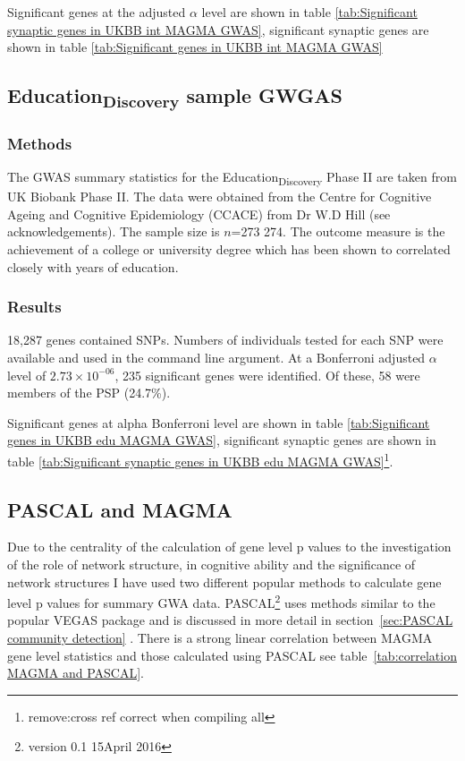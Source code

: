 Significant genes at the adjusted $\alpha$ level are shown in table \ref{tab:Significant synaptic genes in UKBB int  MAGMA GWAS}, significant synaptic genes are shown in table \ref{tab:Significant genes in UKBB int MAGMA GWAS}







\subsection{Education\textsubscript{Discovery} sample GWGAS}
\label{sec:UKBB Education discovery GWGAS}
\subsubsection{Methods}
The GWAS summary statistics for the Education\textsubscript{Discovery} Phase II are taken from UK Biobank Phase II. The data were obtained from the Centre for Cognitive Ageing and Cognitive Epidemiology (CCACE) from Dr W.D Hill (see acknowledgements). The sample size is $n$=273 274. The outcome measure is the achievement of a college or university degree which has been shown to correlated closely with years of education\cite{rietveld2013gwas}.

\subsubsection{Results}
18,287 genes contained SNPs. Numbers of individuals tested for each SNP were available and used in the command line argument. At a Bonferroni adjusted $\alpha$ level of $2.73 \times 10^{-06}$, 235 significant genes were identified. Of these, 58 were members of the PSP (24.7\%).  

Significant genes at alpha Bonferroni level are shown in table \ref{tab:Significant genes in UKBB edu MAGMA GWAS}, significant synaptic genes are shown in table \ref{tab:Significant synaptic genes in UKBB edu  MAGMA GWAS}\footnote{remove:cross ref correct when compiling all}.


\subsection{PASCAL and MAGMA}
Due to the centrality of the calculation of gene level p values to the investigation of the role of network structure, in cognitive ability and the significance of network structures I have used two different popular methods to calculate gene level p values for summary GWA data. PASCAL\footnote{version 0.1 15April 2016} uses methods similar to the popular VEGAS package and is discussed in more detail in section~\ref{sec:PASCAL community detection} \cite{lamparter2016fast} . There is a strong linear correlation between MAGMA gene level statistics and those calculated using PASCAL see table~\ref{tab:correlation MAGMA and PASCAL}. 

